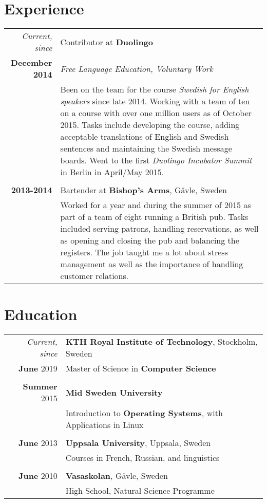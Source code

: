 \documentclass[a4paper,10pt]{article}
\begin{document}
\section{Experience}
\begin{tabular}{r|p{11cm}}
 \emph{Current, since} & Contributor at \textbf{Duolingo}\\\textbf{December 2014}&\emph{Free Language Education, Voluntary Work}\\&\footnotesize{Been on the team for the course \emph{Swedish for English speakers} since late 2014. Working with a team of ten on a course with over one million users as
 of October 2015. Tasks include developing the course, adding acceptable translations of English
 and Swedish sentences and maintaining the Swedish message boards. Went to the first \emph{Duolingo Incubator Summit} in Berlin in April/May 2015.}\\\multicolumn{2}{c}{} \\
\textbf{2013-2014} & Bartender at \textbf{Bishop's Arms}, Gävle, Sweden \\&\footnotesize{Worked for a year and during the summer of 2015 as part of a team of eight running a British pub. Tasks included serving patrons, handling reservations, as well as opening and closing the pub and balancing the registers. The job taught me a lot about stress management as well as the importance of handling customer relations.}
\end{tabular}

\section{Education}
\begin{tabular}{rl}
\emph{Current, since} & \textbf{KTH Royal Institute of Technology}, Stockholm, Sweden\\	
 \textbf{June} 2019 & Master of Science in \textbf{Computer Science}\\&\\
\textbf{Summer} 2015& \textbf{Mid Sweden University}\\& Introduction to \textbf{Operating Systems}, with Applications in Linux\\&\\
\textbf{June} 2013& \textbf{Uppsala University}, Uppsala, Sweden\\& Courses in French, Russian, and linguistics\\&\\
\textbf{June} 2010& \textbf{Vasaskolan}, Gävle, Sweden \\& High School, Natural Science Programme
\end{tabular}
\end{document}

